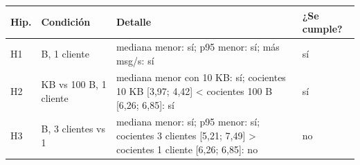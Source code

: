 \begin{tabular}{>{\raggedright\arraybackslash}p{0.8cm} >{\raggedright\arraybackslash}p{2.6cm} >{\raggedright\arraybackslash}p{8.6cm} l}
\toprule
Hip. & Condición & Detalle & ¿Se cumple? \\
\midrule
H1 & 100 B, 1 cliente & mediana menor: sí; p95 menor: sí; más msg/s: sí & sí \\
H2 & 10 KB vs 100 B, 1 cliente & mediana menor con 10 KB: sí; cocientes 10 KB [3,97; 4,42] < cocientes 100 B [6,26; 6,85]: sí & sí \\
H3 & 100 B, 3 clientes vs 1 & mediana menor: sí; p95 menor: sí; cocientes 3 clientes [5,21; 7,49] > cocientes 1 cliente [6,26; 6,85]: no & no \\
\bottomrule
\end{tabular}
